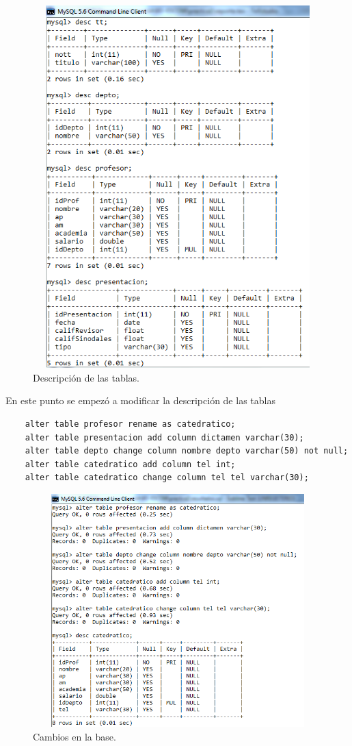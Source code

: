 \documentclass[12pt, titlepage]{article}
\begin{document}
    \begin{figure}[H]
        \begin{center}
            \includegraphics[width=16cm, height=14cm]{img/tablas.png}
            \caption{Descripción de las tablas.}
            \label{fig:tablas}
        \end{center}
    \end{figure}
    En este punto se empezó a modificar la descripción de las tablas
    \begin{lstlisting}
    alter table profesor rename as catedratico;
    alter table presentacion add column dictamen varchar(30);
    alter table depto change column nombre depto varchar(50) not null;
    alter table catedratico add column tel int;
    alter table catedratico change column tel tel varchar(30);
    \end{lstlisting}
    \begin{figure}[H]
        \begin{center}
            \includegraphics[width=14cm, height=9cm]{img/cambios.png}
            \caption{Cambios en la base.}
            \label{fig:cambios}
        \end{center}
    \end{figure}
\end{document}
